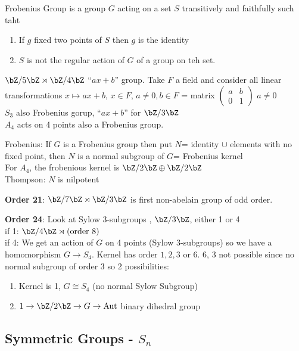 \noindent
Frobenius Group is a group $G$ acting on a set $S$ transitively and faithfully such taht 
\begin{enumerate}
    \item If $g$ fixed two points of $S$ then $g$ is the identity 
    \item $S$ is not the regular action of $G$ of a group on teh set. 
\end{enumerate}

\begin{example}
    $\bZ/5\bZ \rtimes \bZ/4\bZ$ ``$ax+b$'' group. Take $F$ a field and consider all linear transformations $x \mapsto ax+b$, $x \in F$, $a \neq 0 , b \in F$ = matrix $\begin{pmatrix} a & b \\ 0 & 1 \end{pmatrix}$ $a \neq 0$ \\
    $S_3$ also Frobenius gorup, ``$ax+b$'' for $\bZ/3\bZ$ \\
    $A_4$ acts on 4 points also a Frobenius group. 
\end{example}

\noindent
Frobenius: If $G$ is a Frobenius group then put $N$= identity $\cup$ elements with no fixed point, then $N$ is a normal subgroup of $G$= Frobenius kernel \\
For $A_4$, the frobenious kernel is $\bZ/2\bZ \oplus \bZ/2\bZ$ \\
Thompson: $N$ is nilpotent 

\noindent
\textbf{Order 21}: $\bZ/7\bZ \rtimes \bZ/3\bZ$ is first non-abelain group of odd order. 

\noindent
\textbf{Order 24}: Look at Sylow 3-subgroups , $\bZ/3\bZ$, either 1 or 4 \\
if 1: $\bZ/4\bZ \rtimes (\text{order 8})$ \\
if 4: We get an action of $G$ on 4 points (Sylow 3-subgroups) so we have a homomorphism $G \to S_4$. Kernel has order $1, 2, 3$ or $6$. 6, 3 not possible since no normal subgroup of order 3 so 2 possibilities: 
\begin{enumerate}
    \item Kernel is 1, $G \cong S_4$ (no normal Sylow Subgroup) 
    \item $1 \to \bZ/2\bZ \to G \to \text{Aut}$ binary dihedral group
\end{enumerate}

\subsection{Symmetric Groups - $S_n$} 

